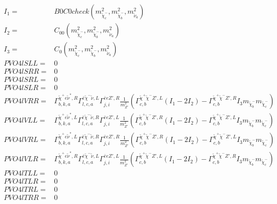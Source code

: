 \documentclass[A4,landscape]{article}
\begin{document}
\begin{align} 
I_1= & B0C0check(m^2_{\tilde{\chi}^-_{{c}}}, m^2_{\tilde{\chi}^-_{{b}}}, m^2_{\tilde{\nu}_{{a}}}) \\ 
I_2= & C_{00}(m^2_{\tilde{\chi}^-_{{c}}}, m^2_{\tilde{\chi}^-_{{b}}}, m^2_{\tilde{\nu}_{{a}}}) \\ 
I_3= & C_0(m^2_{\tilde{\chi}^-_{{c}}}, m^2_{\tilde{\chi}^-_{{b}}}, m^2_{\tilde{\nu}_{{a}}}) \\ 
  PVO4lSLL= & 0 \\ 
  PVO4lSRR= & 0 \\ 
  PVO4lSRL= & 0 \\ 
  PVO4lSLR= & 0 \\ 
  PVO4lVRR= &  \Gamma^{\tilde{\chi}^+e \tilde{\nu}^*,R}_{b, k, a} \Gamma^{\bar{e}\tilde{\chi}^- \tilde{\nu} ,L}_{l, c, a} \Gamma^{\bar{e}e {Z'} ,R}_{j, i} \frac{1}{m^2_{{Z'}}} (\Gamma^{\tilde{\chi}^+\tilde{\chi}^- {Z'} ,L}_{c, b} (I_1 - 2 I_2) - \Gamma^{\tilde{\chi}^+\tilde{\chi}^- {Z'} ,R}_{c, b} I_3 m_{\tilde{\chi}^-_{{b}}} m_{\tilde{\chi}^-_{{c}}}) \\ 
  PVO4lVLL= &  \Gamma^{\tilde{\chi}^+e \tilde{\nu}^*,L}_{b, k, a} \Gamma^{\bar{e}\tilde{\chi}^- \tilde{\nu} ,R}_{l, c, a} \Gamma^{\bar{e}e {Z'} ,L}_{j, i} \frac{1}{m^2_{{Z'}}} (\Gamma^{\tilde{\chi}^+\tilde{\chi}^- {Z'} ,R}_{c, b} (I_1 - 2 I_2) - \Gamma^{\tilde{\chi}^+\tilde{\chi}^- {Z'} ,L}_{c, b} I_3 m_{\tilde{\chi}^-_{{b}}} m_{\tilde{\chi}^-_{{c}}}) \\ 
  PVO4lVRL= &  \Gamma^{\tilde{\chi}^+e \tilde{\nu}^*,L}_{b, k, a} \Gamma^{\bar{e}\tilde{\chi}^- \tilde{\nu} ,R}_{l, c, a} \Gamma^{\bar{e}e {Z'} ,R}_{j, i} \frac{1}{m^2_{{Z'}}} (\Gamma^{\tilde{\chi}^+\tilde{\chi}^- {Z'} ,R}_{c, b} (I_1 - 2 I_2) - \Gamma^{\tilde{\chi}^+\tilde{\chi}^- {Z'} ,L}_{c, b} I_3 m_{\tilde{\chi}^-_{{b}}} m_{\tilde{\chi}^-_{{c}}}) \\ 
  PVO4lVLR= &  \Gamma^{\tilde{\chi}^+e \tilde{\nu}^*,R}_{b, k, a} \Gamma^{\bar{e}\tilde{\chi}^- \tilde{\nu} ,L}_{l, c, a} \Gamma^{\bar{e}e {Z'} ,L}_{j, i} \frac{1}{m^2_{{Z'}}} (\Gamma^{\tilde{\chi}^+\tilde{\chi}^- {Z'} ,L}_{c, b} (I_1 - 2 I_2) - \Gamma^{\tilde{\chi}^+\tilde{\chi}^- {Z'} ,R}_{c, b} I_3 m_{\tilde{\chi}^-_{{b}}} m_{\tilde{\chi}^-_{{c}}}) \\ 
  PVO4lTLL= & 0 \\ 
  PVO4lTLR= & 0 \\ 
  PVO4lTRL= & 0 \\ 
  PVO4lTRR= & 0 \\ 
\end{align} 
\end{document}
